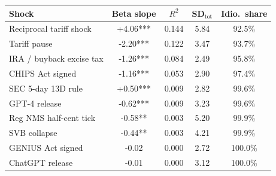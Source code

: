 \begin{tabular}{lcccc}
\toprule
Shock & Beta slope & $R^2$ & SD$_{\text{tot}}$ & Idio.\ share \\
\midrule
Reciprocal tariff shock & +4.06*** & 0.144 & 5.84 & 92.5\% \\
Tariff pause & -2.20*** & 0.122 & 3.47 & 93.7\% \\
IRA / buyback excise tax & -1.26*** & 0.084 & 2.49 & 95.8\% \\
CHIPS Act signed & -1.16*** & 0.053 & 2.90 & 97.4\% \\
SEC 5-day 13D rule & +0.50*** & 0.009 & 2.82 & 99.6\% \\
GPT-4 release & -0.62*** & 0.009 & 3.23 & 99.6\% \\
Reg NMS half-cent tick & -0.58** & 0.003 & 5.20 & 99.9\% \\
SVB collapse & -0.44** & 0.003 & 4.21 & 99.9\% \\
GENIUS Act signed & -0.02 & 0.000 & 2.72 & 100.0\% \\
ChatGPT release & -0.01 & 0.000 & 3.12 & 100.0\% \\
\bottomrule
\end{tabular}